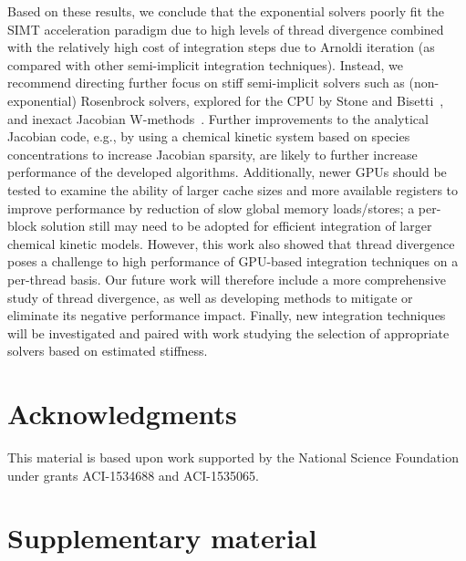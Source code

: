 \documentclass[preprint,review,11pt]{elsarticle}
\begin{document}
Based on these results, we conclude that the exponential solvers poorly fit the SIMT acceleration paradigm due to high levels of thread divergence combined with the relatively high cost of integration steps due to Arnoldi iteration (as compared with other semi-implicit integration techniques).
Instead, we recommend directing further focus on stiff semi-implicit solvers such as (non-exponential) Rosenbrock solvers, explored for the CPU by Stone and Bisetti~\cite{stone2014comparison}, and inexact Jacobian W-methods~\cite{steihaug1979attempt,Schmitt2004}.
Further improvements to the analytical Jacobian code, e.g., by using a chemical kinetic system based on species concentrations to increase Jacobian sparsity, are likely to further increase performance of the developed algorithms.
Additionally, newer GPUs should be tested to examine the ability of larger cache sizes and more available registers to improve performance by reduction of slow global memory loads\slash stores; a per-block solution still may need to be adopted for efficient integration of larger chemical kinetic models.
However, this work also showed that thread divergence poses a challenge to high performance of GPU-based integration techniques on a per-thread basis.
Our future work will therefore include a more comprehensive study of thread divergence, as well as developing methods to mitigate or eliminate its negative performance impact.
Finally, new integration techniques will be investigated and paired with work studying the selection of appropriate solvers based on estimated stiffness.


\section*{Acknowledgments}

This material is based upon work supported by the National Science Foundation under grants ACI-1534688 and ACI-1535065.

\appendix
\setcounter{figure}{0}

\renewcommand*{\thesection}{\appendixname~\Alph{section}}

\section{Supplementary material}
\label{S:supp}
\end{document}
